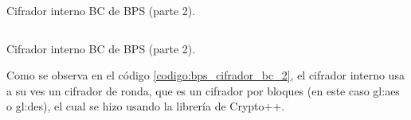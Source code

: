 \begin{listing}
  \inputminted[firstline=111, lastline=165]
    {c++}{../implementaciones/bps/cifrador_BC.cpp}
  \caption{Cifrador interno BC de  BPS (parte 2).}
  \label{codigo:bps_cifrador_bc_1}
\end{listing}

\begin{listing}
  \inputminted[firstline=165, lastline=218]
    {c++}{../implementaciones/bps/cifrador_BC.cpp}
  \caption{Cifrador interno BC de  BPS (parte 2).}
  \label{codigo:bps_cifrador_bc_2}
\end{listing}

Como se observa en el código \ref{codigo:bps_cifrador_bc_2}, el cifrador
interno usa a su ves un cifrador de ronda, que es un cifrador por bloques
(en este caso \gls{gl:aes} o \gls{gl:des}), el cual se hizo usando la
librería de Crypto++.
